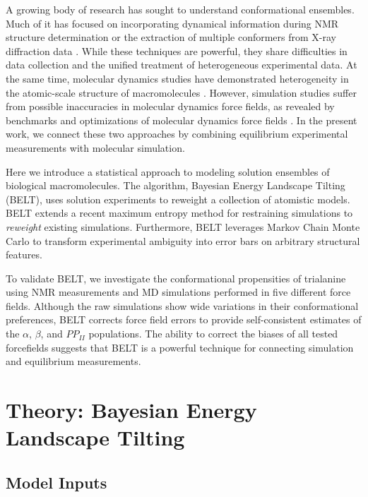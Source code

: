 \documentclass[11pt,titlepage]{article}
\begin{document}
A growing body of research has sought to understand conformational ensembles.  Much of it has focused on incorporating dynamical information during NMR structure determination  \citep{lindorff2005simultaneous, lange2008recognition} or the extraction of multiple conformers from X-ray diffraction data  \citep{depristo2004heterogeneity, lang2010automated}.  While these techniques are powerful, they share difficulties in data collection and the unified treatment of heterogeneous experimental data.  At the same time, molecular dynamics studies have demonstrated heterogeneity in the atomic-scale structure of macromolecules  \citep{shaw2010}.   However, simulation studies suffer from possible inaccuracies in molecular dynamics force fields, as revealed by benchmarks and optimizations of molecular dynamics force fields  \citep{li2011iterative, best2012optimization, lindorff2012systematic}.  In the present work, we connect these two approaches by combining equilibrium experimental measurements with molecular simulation.  

Here we introduce a statistical approach to modeling solution ensembles of biological macromolecules.  The algorithm, Bayesian Energy Landscape Tilting (BELT), uses solution experiments to reweight a collection of atomistic models.  BELT extends a recent maximum entropy method for restraining simulations  \citep{chodera2012} to \emph{reweight} existing simulations.  Furthermore, BELT leverages Markov Chain Monte Carlo to transform experimental ambiguity into error bars on arbitrary structural features.  

To validate BELT, we investigate the conformational propensities of trialanine using NMR measurements  \citep{Graf2007} and MD simulations performed in five different force fields.  Although the raw simulations show wide variations in their conformational preferences, BELT corrects force field errors to provide self-consistent estimates of the $\alpha$, $\beta$, and $PP_{II}$ populations.  The ability to correct the biases of all tested forcefields suggests that BELT is a powerful technique for connecting simulation and equilibrium measurements.  

\section*{Theory: Bayesian Energy Landscape Tilting}

\subsection*{Model Inputs}
\end{document}

